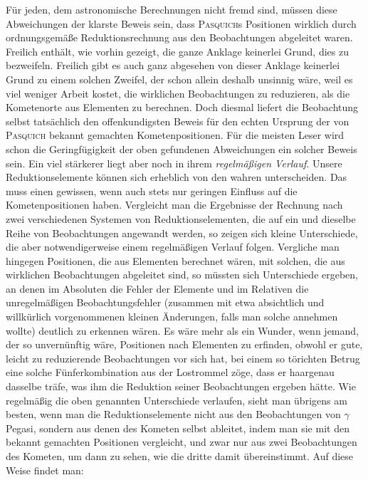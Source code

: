 Für jeden, dem astronomische Berechnungen nicht fremd sind, müssen diese
Abweichungen der klarste Beweis sein, dass \textsc{Pasquich}s Positionen
wirklich durch ordnungsgemäße Reduktionsrechnung aus den Beobachtungen
abgeleitet waren. Freilich enthält, wie vorhin gezeigt, die ganze Anklage
keinerlei Grund, dies zu bezweifeln. Freilich gibt es auch ganz abgesehen
von dieser Anklage keinerlei Grund zu einem solchen Zweifel, der schon
allein deshalb unsinnig wäre, weil es viel weniger Arbeit kostet, die
wirklichen Beobachtungen zu reduzieren, als die Kometenorte aus Elementen
zu berechnen. Doch diesmal liefert die Beobachtung selbst tatsächlich den
offenkundigsten Beweis für den echten Ursprung der von \textsc{Pasquich}
bekannt gemachten Kometenpositionen. Für die meisten Leser wird schon die
Geringfügigkeit der oben gefundenen Abweichungen ein solcher Beweis sein.
Ein viel \enlargethispage{1pt} stärkerer liegt aber noch in ihrem \emph{regelmäßigen Verlauf}.
Unsere Reduktionselemente können sich erheblich von den wahren unterscheiden.
Das muss einen gewissen, wenn auch stets nur geringen Einfluss auf die
Kometenpositionen haben. Vergleicht man die Ergebnisse der Rechnung nach
zwei verschiedenen Systemen von Reduktionselementen, die auf ein und dieselbe
Reihe von Beobachtungen angewandt werden, so zeigen sich kleine Unterschiede,
die aber notwendigerweise einem regelmäßigen Verlauf folgen. Vergliche man
hingegen Positionen, die aus Elementen berechnet wären, mit solchen, die aus
wirklichen Beobachtungen abgeleitet sind, so müssten sich Unterschiede
ergeben, an denen im Absoluten die Fehler der Elemente und im Relativen die
unregelmäßigen Beobachtungsfehler (zusammen mit etwa absichtlich und willkürlich
vorgenommenen kleinen Änderungen, falls man solche annehmen wollte) deutlich
zu erkennen wären. Es wäre mehr als ein Wunder, wenn jemand, der so unvernünftig
wäre, Positionen nach Elementen zu erfinden, obwohl er gute, leicht zu
reduzierende Beobachtungen vor sich hat, bei einem so törichten Betrug eine
solche Fünferkombination aus der Lostrommel zöge, dass er haargenau dasselbe
träfe, was ihm die Reduktion seiner Beobachtungen ergeben hätte. Wie regelmäßig
die oben genannten Unterschiede verlaufen, sieht man übrigens am besten, wenn
man die Reduktionselemente nicht aus den Beobachtungen von $\gamma$ Pegasi,
sondern aus denen des Kometen selbst ableitet, indem man sie mit den bekannt
gemachten Positionen vergleicht, und zwar nur aus zwei Beobachtungen des
Kometen, um dann zu sehen, wie die dritte damit übereinstimmt. Auf diese
Weise findet man:

